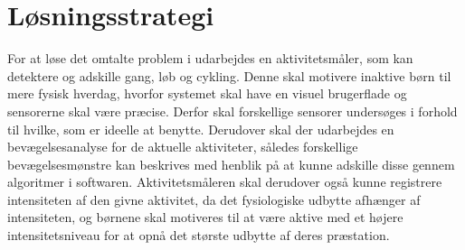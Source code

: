 \section{Løsningsstrategi}


%



For at løse det omtalte problem i  udarbejdes en aktivitetsmåler, som kan detektere og adskille gang, løb og cykling. Denne skal motivere inaktive børn til mere fysisk hverdag, hvorfor systemet skal have en visuel brugerflade og sensorerne skal være præcise. Derfor skal forskellige sensorer undersøges i forhold til hvilke, som er ideelle at benytte. Derudover skal der udarbejdes en bevægelsesanalyse for de aktuelle aktiviteter, således forskellige bevægelsesmønstre kan beskrives med henblik på at kunne adskille disse gennem algoritmer i softwaren. Aktivitetsmåleren skal derudover også kunne registrere intensiteten af den givne aktivitet, da det fysiologiske udbytte afhænger af intensiteten, og børnene skal motiveres til at være aktive med et højere intensitetsniveau for at opnå det største udbytte af deres præstation. 

